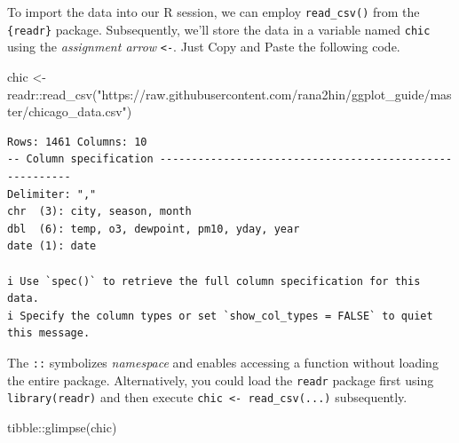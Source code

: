 \documentclass[
  letterpaper,
]{scrbook}
\newenvironment{Shaded}{\begin{snugshade}}{\end{snugshade}}
\newcommand{\FunctionTok}[1]{\textcolor[rgb]{0.28,0.35,0.67}{#1}}
\newcommand{\NormalTok}[1]{\textcolor[rgb]{0.00,0.23,0.31}{#1}}
\newcommand{\OtherTok}[1]{\textcolor[rgb]{0.00,0.23,0.31}{#1}}
\newcommand{\SpecialCharTok}[1]{\textcolor[rgb]{0.37,0.37,0.37}{#1}}
\newcommand{\StringTok}[1]{\textcolor[rgb]{0.13,0.47,0.30}{#1}}
\begin{document}
To import the data into our R session, we can employ
\texttt{read\_csv()} from the \texttt{\{readr\}} package. Subsequently,
we'll store the data in a variable named \texttt{chic} using the
\emph{assignment arrow} \texttt{\textless{}-}. Just Copy and Paste the
following code.

\begin{Shaded}
\begin{Highlighting}[]
\NormalTok{chic }\OtherTok{\textless{}{-}}\NormalTok{ readr}\SpecialCharTok{::}\FunctionTok{read\_csv}\NormalTok{(}\StringTok{"https://raw.githubusercontent.com/rana2hin/ggplot\_guide/master/chicago\_data.csv"}\NormalTok{)}
\end{Highlighting}
\end{Shaded}

\begin{verbatim}
Rows: 1461 Columns: 10
-- Column specification --------------------------------------------------------
Delimiter: ","
chr  (3): city, season, month
dbl  (6): temp, o3, dewpoint, pm10, yday, year
date (1): date

i Use `spec()` to retrieve the full column specification for this data.
i Specify the column types or set `show_col_types = FALSE` to quiet this message.
\end{verbatim}

\begin{tcolorbox}[enhanced jigsaw, toprule=.15mm, bottomtitle=1mm, coltitle=black, breakable, colbacktitle=quarto-callout-tip-color!10!white, opacityback=0, toptitle=1mm, colframe=quarto-callout-tip-color-frame, titlerule=0mm, title=\textcolor{quarto-callout-tip-color}{\faLightbulb}\hspace{0.5em}{Using namespace Directly}, bottomrule=.15mm, arc=.35mm, opacitybacktitle=0.6, leftrule=.75mm, left=2mm, rightrule=.15mm, colback=white]

The \texttt{::} symbolizes \emph{namespace} and enables accessing a
function without loading the entire package. Alternatively, you could
load the \texttt{readr} package first using \texttt{library(readr)} and
then execute \texttt{chic\ \textless{}-\ read\_csv(...)} subsequently.

\end{tcolorbox}

\begin{Shaded}
\begin{Highlighting}[]
\NormalTok{tibble}\SpecialCharTok{::}\FunctionTok{glimpse}\NormalTok{(chic)}
\end{Highlighting}
\end{Shaded}
\end{document}
